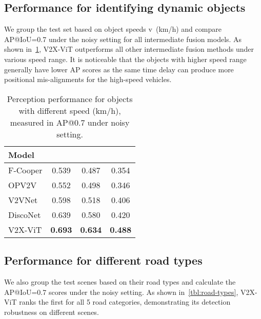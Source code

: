 \documentclass[runningheads]{llncs}
\begin{document}
\subsection{Performance for identifying dynamic objects}
We group the test set based on object speeds v~(km/h) and compare AP@IoU=0.7 under the noisy setting for all intermediate fusion models. As shown in~\cref{tbl:dynamic-objects}, V2X-ViT outperforms all other intermediate fusion methods under various speed range. It is noticeable that the objects with higher speed range generally have lower AP scores as the same time delay can produce more positional mis-alignments for the high-speed vehicles. 

\begin{table}[!htb]
\centering
\footnotesize
\setlength{\tabcolsep}{10pt}
\renewcommand\thetable{T3}
\caption{Perception performance for objects with different speed (km/h), measured in AP@0.7 under noisy setting.}
\label{tbl:dynamic-objects}
\begin{tabular}{l|c|c|c}
 \cellcolor{lightgray} Model &   \cellcolor{lightgray}   &  \cellcolor{lightgray}  &  \cellcolor{lightgray}  \\ \toprule 
 F-Cooper & 0.539 & 0.487 & 0.354 \\
 OPV2V  & 0.552 & 0.498 & 0.346\\
 V2VNet  & 0.598 & 0.518 & 0.406 \\
DiscoNet  & 0.639 & 0.580 & 0.420 \\
 V2X-ViT   & \textbf{0.693} & \textbf{0.634} &  \textbf{0.488} \\  \bottomrule
\end{tabular}
\end{table}

\subsection{Performance for different road types}
We also group the test scenes based on their road types and calculate the AP@IoU=0.7 scores under the noisy setting. As shown in~\cref{tbl:road-types}, V2X-ViT ranks the first for all 5 road categories, demonstrating its detection robustness on different scenes.
\end{document}
